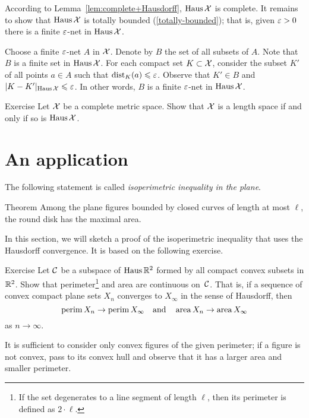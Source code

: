 According to Lemma~\ref{lem:complete+Hausdorff},
$\operatorname{\rm Haus}\nolimits\mathcal{X}$ is complete.
It remains to show that $\operatorname{\rm Haus}\nolimits\mathcal{X}$ is totally bounded (\ref{totally-bounded});
that is, given $\varepsilon>0$ there is a finite $\varepsilon$-net in $\operatorname{\rm Haus}\nolimits\mathcal{X}$.

Choose a finite $\varepsilon$-net $A$ in $\mathcal{X}$.
Denote by $B$ the set of all subsets of $A$.
Note that  $B$ is a finite set in $\operatorname{\rm Haus}\nolimits\mathcal{X}$.
For each compact set $K\subset \mathcal{X}$, consider the subset $K'$ of all points $a\in A$
such that $\mathrm{dist}_K(a)\leqslant \varepsilon$.
Observe that $K' \in B$ and $|K-K'|_{\operatorname{\rm Haus}\nolimits\mathcal{X}}\leqslant\varepsilon$.
In other words, $B$ is a finite $\varepsilon$-net in $\operatorname{\rm Haus}\nolimits\mathcal{X}$.
\qeds

\begin{thm}{Exercise}\label{ex:Haus-length}
Let $\mathcal{X}$ be a complete metric space.
Show that $\mathcal{X}$ is a length space if and only if so is $\operatorname{\rm Haus}\nolimits\mathcal{X}$.
\end{thm}

\section{An application}

The following statement is called \emph{isoperimetric inequality in the plane}.

\begin{thm}{Theorem}\label{thm:isoperimetric}
Among the plane figures bounded by closed curves of length at most $\ell$, the round disk has the maximal area.
\end{thm}

In this section, we will sketch a proof of the isoperimetric inequality that uses the Hausdorff convergence.
It is based on the following exercise.

\begin{thm}{Exercise}\label{ex:Huas-perimeter-area}
Let $\mathcal{C}$ be a subspace of $\operatorname{\rm Haus}\nolimits\mathbb{R}^2$ formed by all compact convex subsets in $\mathbb{R}^2$.
Show that perimeter\footnote{If the set degenerates to a line segment of length $\ell$, then its perimeter is defined as $2\cdot \ell$.} and area are continuous on~$\mathcal{C}$.
That is, if a sequence of convex compact plane sets $X_n$ converges to $X_\infty$ in the sense of Hausdorff, then 
\[\operatorname{\rm perim}\nolimits X_n\to \operatorname{\rm perim}\nolimits X_\infty\quad\text{and}\quad\operatorname{\rm area}\nolimits X_n\to\operatorname{\rm area}\nolimits X_\infty\]
as $n\to\infty$.
\end{thm}

It is sufficient to consider only convex figures of the given perimeter; if a figure is not convex, pass to its convex hull and observe that it has a larger area and smaller perimeter.



